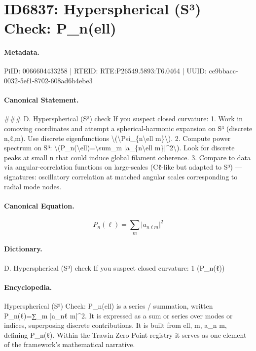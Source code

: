 \section*{ID6837: Hyperspherical (S³) Check: P\_n(ell)}
\paragraph{Metadata.}
PiID: 0066604433258 | RTEID: RTE:P26549.5893:T6.0464 | UUID: ce9bbacc-0032-5ef1-8702-608ad6b4ebe3

\paragraph{Canonical Statement.}
\#\#\# D. Hyperspherical (S³) check If you suspect closed curvature: 1. Work in comoving coordinates and attempt a spherical-harmonic expansion on S³ (discrete n,ℓ,m). Use discrete eigenfunctions \textbackslash{}(\textbackslash{}Psi\_\{n\textbackslash{}ell m\}\textbackslash{}). 2. Compute power spectrum on S³: \textbackslash{}(P\_n(\textbackslash{}ell)=\textbackslash{}sum\_m |a\_\{n\textbackslash{}ell m\}|\textasciicircum{}2\textbackslash{}). Look for discrete peaks at small n that could induce global filament coherence. 3. Compare to data via angular-correlation functions on large-scales (Cℓ-like but adapted to S³) — signatures: oscillatory correlation at matched angular scales corresponding to radial mode nodes.

\paragraph{Canonical Equation.}
\[
P_n(\ell)=\sum_m |a_{n\ell m}|^2
\]

\paragraph{Dictionary.}
D. Hyperspherical (S³) check If you suspect closed curvature: 1 (P\_n(ℓ))

\paragraph{Encyclopedia.}
Hyperspherical (S³) Check: P\_n(ell) is a series / summation, written P\_n(ℓ)=∑\_m |a\_nℓ m|\textasciicircum{}2. It is expressed as a sum or series over modes or indices, superposing discrete contributions. It is built from ell, m, a\_n m, defining P\_n(ℓ). Within the Trawin Zero Point registry it serves as one element of the framework's mathematical narrative.
